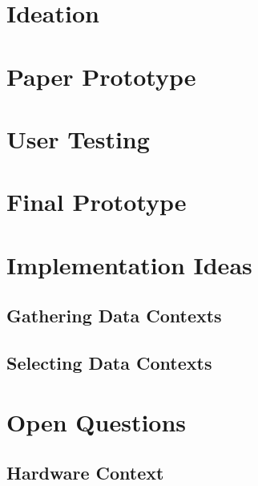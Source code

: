 \documentclass[runningheads]{llncs}
\begin{document}
\section{Ideation} \label{sec:IDEATION}

\section{Paper Prototype} \label{sec:PAPER_PROTOTYPE}

\section{User Testing} \label{sec:USER_TESTING}

\section{Final Prototype} \label{sec:FINAL_PROTOTYPE}

\section{Implementation Ideas} \label{sec:IMPLEMENTATION_IDEAS}
\subsection{Gathering Data Contexts}
\subsection{Selecting Data Contexts}

\section{Open Questions} \label{sec:OPEN_QUESTIONS}
\subsection{Hardware Context}
\end{document}
